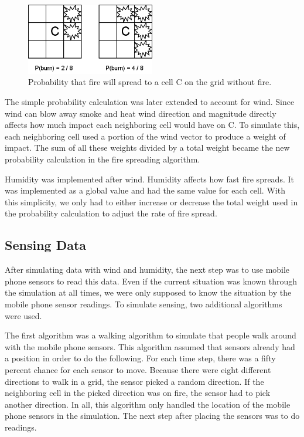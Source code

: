 \begin{figure}[here]
\centering
\includegraphics[width=0.5\textwidth]{solution/graphics/fire-probability.png}
\caption{Probability that fire will spread to a cell C on the grid without fire.}
\label{fig:fire-probability}
\end{figure}

The simple probability calculation was later extended to account for wind. Since wind can blow away smoke and heat wind direction and magnitude directly affects how much impact each neighboring cell would have on C. To simulate this, each neighboring cell used a portion of the wind vector to produce a weight of impact. The sum of all these weights divided by a total weight became the new probability calculation in the fire spreading algorithm.

Humidity was implemented after wind. Humidity affects how fast fire spreads. It was implemented as a global value and had the same value for each cell. With this simplicity, we only had to either increase or decrease the total weight used in the probability calculation to adjust the rate of fire spread.
\subsection{Sensing Data}
After simulating data with wind and humidity, the next step was to use mobile phone sensors to read this data. Even if the current situation was known through the simulation at all times, we were only supposed to know the situation by the mobile phone sensor readings. To simulate sensing, two additional algorithms were used.

The first algorithm was a walking algorithm to simulate that people walk around with the mobile phone sensors. This algorithm assumed that sensors already had a position in order to do the following. For each time step, there was a fifty percent chance for each sensor to move. Because there were eight different directions to walk in a grid, the sensor picked a random direction. If the neighboring cell in the picked direction was on fire, the sensor had to pick another direction. In all, this algorithm only handled the location of the mobile phone sensors in the simulation. The next step after placing the sensors was to do readings.

